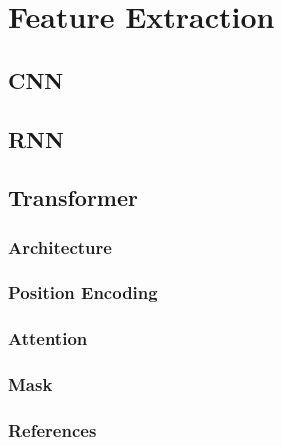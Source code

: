 \chapter{Feature Extraction}
\label{ch:feature_extraction}
\section{CNN}
\section{RNN}
\section{Transformer}
\subsection{Architecture}

\subsection{Position Encoding}
\subsection{Attention}
\subsection{Mask}
\subsection{References}
	